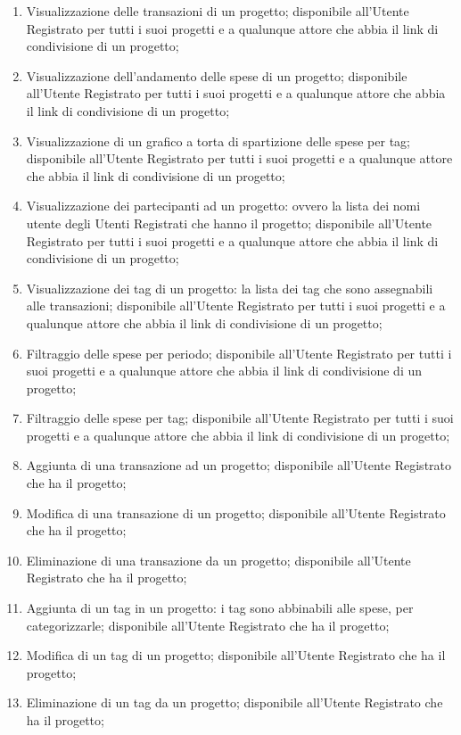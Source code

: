 \begin{enumerate}
    \item Visualizzazione delle transazioni di un progetto; disponibile
		all'Utente Registrato per tutti i suoi progetti e a qualunque attore che
		abbia il link di condivisione di un progetto;

    \item Visualizzazione dell'andamento delle spese di un progetto;
    disponibile all'Utente Registrato per tutti i suoi progetti e a qualunque
		attore che abbia il link di condivisione di un progetto;

    \item Visualizzazione di un grafico a torta di spartizione delle spese per
		tag;  disponibile all'Utente Registrato per tutti i suoi progetti e a
		qualunque attore che abbia il link di condivisione di un progetto;

    \item Visualizzazione dei partecipanti ad un progetto: ovvero la lista dei nomi utente degli Utenti Registrati che hanno il progetto;
    disponibile all'Utente Registrato per tutti i suoi progetti e a qualunque
		attore che abbia il link di condivisione di un progetto;

    \item Visualizzazione dei tag di un progetto: la lista dei tag che sono
		assegnabili alle transazioni; disponibile all'Utente Registrato per
		tutti i suoi progetti e a qualunque attore che abbia il link di condivisione di un progetto;

    \item Filtraggio delle spese per periodo; disponibile all'Utente Registrato
		per tutti i suoi progetti e a qualunque attore che abbia il link di condivisione di un progetto;

    \item Filtraggio delle spese per tag; disponibile all'Utente Registrato per
		tutti i suoi progetti e a qualunque attore che abbia il link di condivisione di un progetto;
     
    \item Aggiunta di una transazione ad un progetto; disponibile all'Utente Registrato che ha il progetto;

    \item Modifica di una transazione di un progetto; disponibile all'Utente Registrato che ha il progetto;

    \item Eliminazione di una transazione da un progetto; disponibile all'Utente Registrato che ha il progetto;

    \item Aggiunta di un tag in un progetto: i tag sono abbinabili alle spese, per categorizzarle; disponibile all'Utente Registrato che ha il progetto;

    \item Modifica di un tag di un progetto; disponibile all'Utente Registrato che ha il progetto;

    \item Eliminazione di un tag da un progetto; disponibile all'Utente Registrato che ha il progetto;
\end{enumerate}

